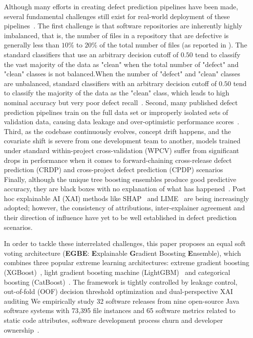 \documentclass[conference]{IEEEtran}
\begin{document}
Although many efforts in creating defect prediction pipelines have been made, several fundamental challenges still exist for real-world deployment of these pipelines~\cite{sottomayor2024survey, tantithamthavorn2019optimization}.
The first challenge is that software repositories are inherently highly imbalanced, that is, the number of files in a repository that are defective is generally less than $10\%$ to $20\%$ of the total number of files (as reported in \cite{chicco2020mcc}).
The standard classifiers that use an arbitrary decision cutoff of $0.50$ tend to classify the vast majority of the data as "clean" when the total number of "defect" and "clean" classes is not balanced.When the number of "defect" and "clean" classes are unbalanced, standard classifiers with an arbitrary decision cutoff of $0.50$ tend to classify the majority of the data as the "clean" class, which leads to high nominal accuracy but very poor defect recall~\cite{tantithamthavorn2019optimization}.
Second, many published defect prediction pipelines train on the full data set or improperly isolated sets of validation data, causing data leakage and over-optimistic performance scores~\cite{tantithamthavorn2019optimization}.
Third, as the codebase continuously evolves, concept drift happens, and the covariate shift is severe from one development team to another, models trained under standard within-project cross-validation (WPCV) suffer from significant drops in performance when it comes to forward-chaining cross-release defect prediction (CRDP) and cross-project defect prediction (CPDP) scenarios~\cite{sottomayor2024survey, turhan2009crosscompany}
Finally, although the unique tree boosting ensembles produce good predictive accuracy, they are black boxes with no explanation of what has happened~\cite{ali2024ensemble}.
Post hoc explainable AI (XAI) methods like SHAP~\cite{lundberg2017shap} and LIME~\cite{ribeiro2016lime} are being increasingly adopted; however, the consistency of attributions, inter-explainer agreement and their direction of influence have yet to be well established in defect prediction scenarios.

In order to tackle these interrelated challenges, this paper proposes an equal soft voting architecture (\textbf{EGBE}: \textbf{E}xplainable \textbf{G}radient Boosting \textbf{E}nsemble), which combines three popular extreme learning architectures: extreme gradient boosting (XGBoost)~\cite{chen2016xgboost}, light gradient boosting machine (LightGBM)~\cite{ke2017lightgbm} and categorical boosting (CatBoost)~\cite{prokhorenkova2018catboost}.
The framework is tightly controlled by leakage control, out-of-fold (OOF) decision threshold optimization and dual-perspective XAI auditing %
We empirically study 32 software releases from nine open-source Java software systems with 73,395 file instances and 65 software metrics related to static code attributes, software development process churn and developer ownership~\cite{yatish2019affected}.
\end{document}
